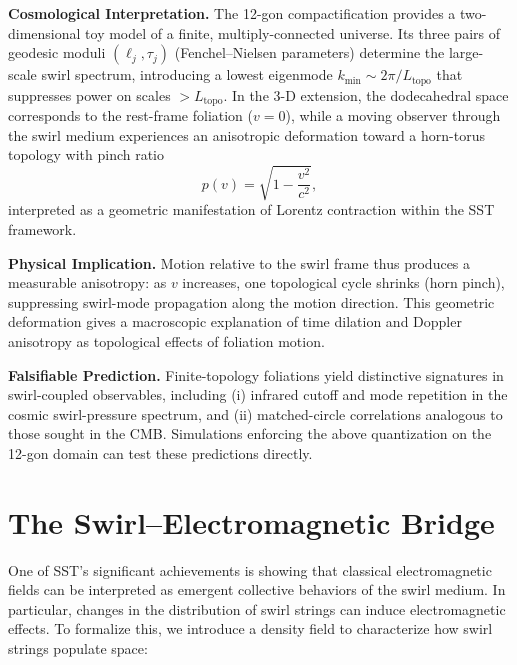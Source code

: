 \documentclass[10pt,reprint,aps,onecolumn,nofootinbib]{revtex4-2}
\begin{document}
    \vspace{0.5em}
    \noindent
    \textbf{Cosmological Interpretation.}
    The 12-gon compactification provides a two-dimensional toy model of a finite,
    multiply-connected universe.  Its three pairs of geodesic moduli $(\ell_j,\tau_j)$
    (Fenchel–Nielsen parameters) determine the large-scale swirl spectrum, introducing a
    lowest eigenmode $k_{\min}\!\sim\!2\pi/L_{\text{topo}}$ that suppresses power on scales
    $>\!L_{\text{topo}}$.  In the 3-D extension, the dodecahedral space corresponds to the
    rest-frame foliation ($v\!=\!0$), while a moving observer through the swirl medium
    experiences an anisotropic deformation toward a horn-torus topology with
    pinch ratio
    \begin{equation}
        p(v)=\sqrt{1-\frac{v^2}{c^2}},
    \end{equation}
    interpreted as a geometric manifestation of Lorentz contraction within the SST
    framework.

    \vspace{0.5em}
    \noindent
    \textbf{Physical Implication.}
    Motion relative to the swirl frame thus produces a measurable anisotropy:
    as $v$ increases, one topological cycle shrinks (horn pinch), suppressing
    swirl-mode propagation along the motion direction.
    This geometric deformation gives a macroscopic explanation of time dilation and
    Doppler anisotropy as topological effects of foliation motion.

    \vspace{0.5em}
    \noindent
    \textbf{Falsifiable Prediction.}
    Finite-topology foliations yield distinctive signatures in swirl-coupled observables,
    including (i) infrared cutoff and mode repetition in the cosmic swirl-pressure spectrum,
    and (ii) matched-circle correlations analogous to those sought in the CMB.
    Simulations enforcing the above quantization on the 12-gon domain can test these
    predictions directly.




    \section{The Swirl–Electromagnetic Bridge}
    One of SST’s significant achievements is showing that classical electromagnetic fields can be interpreted as emergent collective behaviors of the swirl medium. In particular, changes in the distribution of swirl strings can induce electromagnetic effects. To formalize this, we introduce a density field to characterize how swirl strings populate space:
\end{document}

